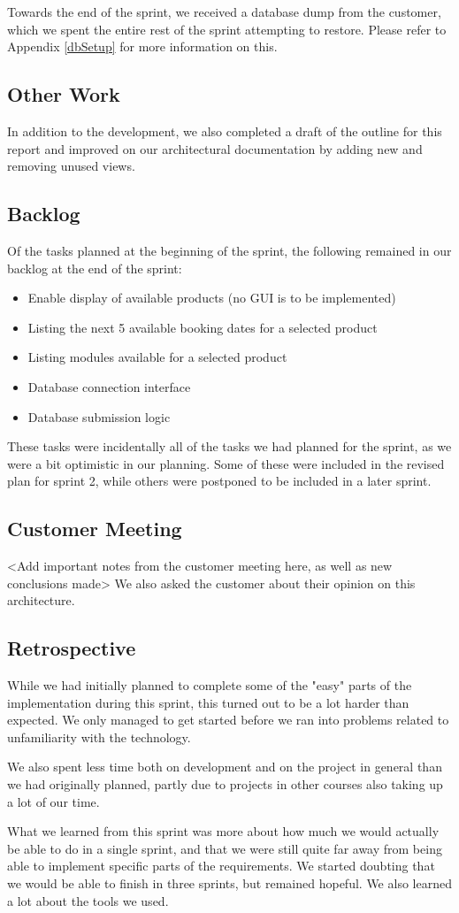 Towards the end of the sprint, we received a database dump from the customer, which we spent the entire rest of the sprint attempting to restore. Please refer to Appendix \ref{dbSetup} for more information on this.

\subsection{Other Work}
In addition to the development, we also completed a draft of the outline for this report and improved on our architectural documentation by adding new and removing unused views.

\subsection{Backlog}
Of the tasks planned at the beginning of the sprint, the following remained in our backlog at the end of the sprint:
\begin{itemize}
	\item Enable display of available products (no GUI is to be implemented)
	\item Listing the next 5 available booking dates for a selected product
	\item Listing modules available for a selected product
	\item Database connection interface
	\item Database submission logic
\end{itemize}

These tasks were incidentally all of the tasks we had planned for the sprint, as we were a bit optimistic in our planning. Some of these were included in the revised plan for sprint 2, while others were postponed to be included in a later sprint.

\subsection{Customer Meeting}
<Add important notes from the customer meeting here, as well as new conclusions made>
We also asked the customer about their opinion on this architecture.

\subsection{Retrospective}
While we had initially planned to complete some of the "easy" parts of the implementation during this sprint, this turned out to be a lot harder than expected. We only managed to get started before we ran into problems related to unfamiliarity with the technology.

We also spent less time both on development and on the project in general than we had originally planned, partly due to projects in other courses also taking up a lot of our time.

What we learned from this sprint was more about how much we would actually be able to do in a single sprint, and that we were still quite far away from being able to implement specific parts of the requirements. We started doubting that we would be able to finish in three sprints, but remained hopeful. We also learned a lot about the tools we used.
